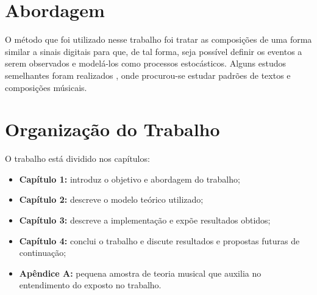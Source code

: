 \section{Abordagem}

O método que foi utilizado nesse trabalho foi tratar as composições de uma forma similar a sinais digitais para que, de tal forma, seja possível definir os eventos a serem observados e modelá-los como processos estocásticos. Alguns estudos semelhantes foram realizados \cite{artigomit}, onde procurou-se estudar padrões de textos e composições músicais.

\section{Organização do Trabalho}

O trabalho está dividido nos capítulos:

\begin{itemize}
    \item \textbf{Capítulo 1:} introduz o objetivo e abordagem do trabalho;
    \item \textbf{Capítulo 2:} descreve o modelo teórico utilizado;
    \item \textbf{Capítulo 3:} descreve a implementação e expõe resultados obtidos;
    \item \textbf{Capítulo 4:} conclui o trabalho e discute resultados e propostas futuras de continuação;
    \item \textbf{Apêndice A:} pequena amostra de teoria musical que auxilia no entendimento do exposto no trabalho.
\end{itemize}

    